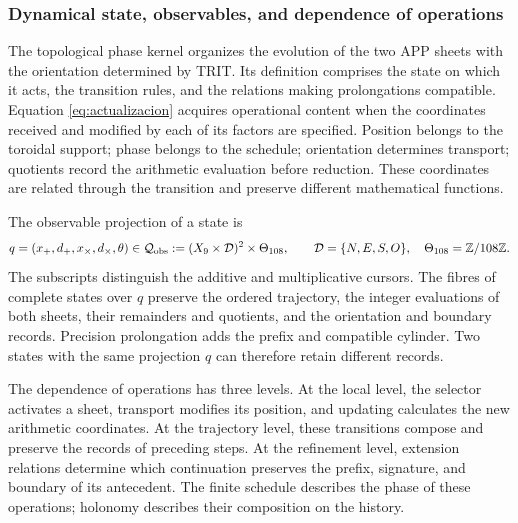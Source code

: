 
\subsubsection{Dynamical state, observables, and dependence of operations}
\label{tpk-int:estado}

The topological phase kernel organizes the evolution of the two APP sheets
with the orientation determined by TRIT. Its definition comprises the state
on which it acts, the transition rules, and the relations making
prolongations compatible. Equation \eqref{eq:actualizacion} acquires
operational content when the coordinates received and modified by each
of its factors are specified. Position belongs to the toroidal support; phase
belongs to the schedule; orientation determines transport; quotients
record the arithmetic evaluation before reduction.
These coordinates are related through the transition and preserve different
mathematical functions.

The observable projection of a state is
\begin{equation}
 q=(x_+,d_+,x_\times,d_\times,\theta)
 \in\mathcal Q_{\rm obs}
 :=(X_9\times\mathcal D)^2\times\Theta_{108},
 \qquad \mathcal D=\{N,E,S,O\},\quad
 \Theta_{108}=\mathbb Z/108\mathbb Z.
 \label{tpk-int:qobs}
\end{equation}
The subscripts distinguish the additive and multiplicative cursors. The
fibres of complete states over \(q\) preserve the ordered trajectory, the integer
evaluations of both sheets, their remainders and quotients, and the orientation
and boundary records. Precision prolongation adds the
prefix and compatible cylinder. Two states with the same
projection \(q\) can therefore retain different records.

The dependence of operations has three levels. At the local level,
the selector activates a sheet, transport modifies its position, and
updating calculates the new arithmetic coordinates. At the trajectory
level, these transitions compose and preserve the records of
preceding steps. At the refinement level, extension relations
determine which continuation preserves the prefix, signature, and
boundary of its antecedent. The finite schedule describes the phase of these
operations; holonomy describes their composition on the history.

